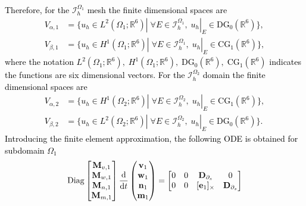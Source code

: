 \documentclass[11pt,a4paper]{article}
\newcommand{\revtwo}[1]{{\textcolor{black}{#1}}}
\begin{document}
\revtwo{
Therefore, for the $\mathcal{I}_h^{\Omega_1}$ mesh the finite dimensional spaces are
\begin{equation*}
    \begin{aligned}
        V_{\alpha, 1} &= \{u_h \in L^2(\Omega_1; \mathbb{R}^6)|\; \forall E \in \mathcal{I}_h^{\Omega_1}, \; u_h|_E \in \mathrm{DG}_0(\mathbb{R}^6)\}, \\
       V_{\beta, 1} &= \{u_h \in H^1(\Omega_1; \mathbb{R}^6)|\; \forall E \in \mathcal{I}_h^{\Omega_1}, \; u_h|_E \in \mathrm{CG}_1(\mathbb{R}^6)\},
    \end{aligned}
\end{equation*}
where the notation $L^2(\Omega_1; \mathbb{R}^6), \; H^1(\Omega_1; \mathbb{R}^6), \; \mathrm{DG}_0(\mathbb{R}^6), \; \mathrm{CG}_1(\mathbb{R}^6)$ indicates the functions are six dimensional vectors. For the $\mathcal{I}_h^{\Omega_2}$ domain the finite dimensional spaces are
\begin{equation*}
    \begin{aligned}
        V_{\alpha, 2} &= \{u_h \in H^1(\Omega_2; \mathbb{R}^6)|\; \forall E \in \mathcal{I}_h^{\Omega_2}, \; u_h|_E \in \mathrm{CG}_1(\mathbb{R}^6) \}, \\
        V_{\beta, 2} &= \{u_h \in L^2(\Omega_2; \mathbb{R}^6)|\; \forall E \in \mathcal{I}_h^{\Omega_2}, \; u_h|_E \in \mathrm{DG}_0(\mathbb{R}^6) \}.
    \end{aligned}
\end{equation*}
Introducing the finite element approximation, the following ODE is obtained for subdomain $\Omega_1$  
\begin{equation}\label{eq:discrete_clamped_intrinsic}
\mathrm{Diag}
\begin{bmatrix}
\mathbf{M}_{v, 1} \\ 
\mathbf{M}_{w, 1} \\
\mathbf{M}_{n, 1} \\
\mathbf{M}_{m, 1}
\end{bmatrix}
    \odv{}{t}
    \begin{pmatrix}
        \mathbf{v}_1 \\
        \mathbf{w}_1 \\
        \mathbf{n}_1 \\
        \mathbf{m}_1
    \end{pmatrix} = 
    \begin{bmatrix}
        0 & 0 & \mathbf{D}_{\partial_s} & 0 \\
        0 & 0 & [\mathbf{e}_{1}]_\times & \mathbf{D}_{\partial_s} \\

\end{bmatrix}
\end{equation}}
\end{document}
